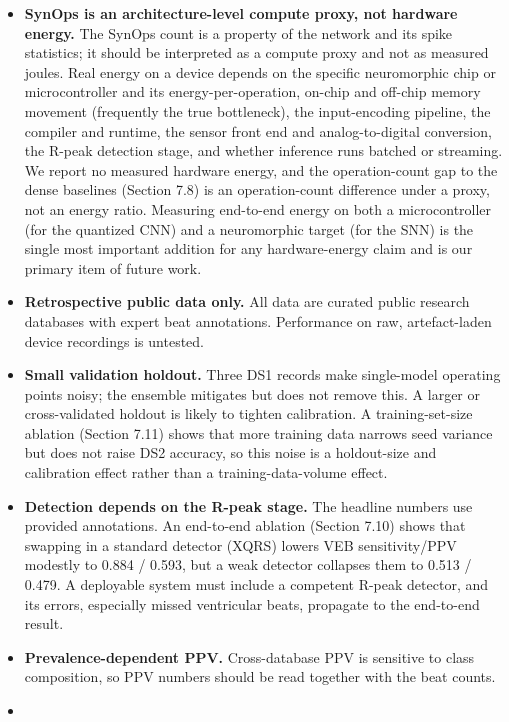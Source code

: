 \documentclass[
]{article}
\providecommand{\tightlist}{%
  \setlength{\itemsep}{0pt}\setlength{\parskip}{0pt}}
\begin{document}
\begin{itemize}
\tightlist
\item
  \textbf{SynOps is an architecture-level compute proxy, not hardware
  energy.} The SynOps count is a property of the network and its spike
  statistics; it should be interpreted as a compute proxy and not as
  measured joules. Real energy on a device depends on the specific
  neuromorphic chip or microcontroller and its energy-per-operation,
  on-chip and off-chip memory movement (frequently the true bottleneck),
  the input-encoding pipeline, the compiler and runtime, the sensor
  front end and analog-to-digital conversion, the R-peak detection
  stage, and whether inference runs batched or streaming. We report no
  measured hardware energy, and the operation-count gap to the dense
  baselines (Section 7.8) is an operation-count difference under a
  proxy, not an energy ratio. Measuring end-to-end energy on both a
  microcontroller (for the quantized CNN) and a neuromorphic target (for
  the SNN) is the single most important addition for any hardware-energy
  claim and is our primary item of future work.
\item
  \textbf{Retrospective public data only.} All data are curated public
  research databases with expert beat annotations. Performance on raw,
  artefact-laden device recordings is untested.
\item
  \textbf{Small validation holdout.} Three DS1 records make single-model
  operating points noisy; the ensemble mitigates but does not remove
  this. A larger or cross-validated holdout is likely to tighten
  calibration. A training-set-size ablation (Section 7.11) shows that
  more training data narrows seed variance but does not raise DS2
  accuracy, so this noise is a holdout-size and calibration effect
  rather than a training-data-volume effect.
\item
  \textbf{Detection depends on the R-peak stage.} The headline numbers
  use provided annotations. An end-to-end ablation (Section 7.10) shows
  that swapping in a standard detector (XQRS) lowers VEB sensitivity/PPV
  modestly to 0.884 / 0.593, but a weak detector collapses them to 0.513
  / 0.479. A deployable system must include a competent R-peak detector,
  and its errors, especially missed ventricular beats, propagate to the
  end-to-end result.
\item
  \textbf{Prevalence-dependent PPV.} Cross-database PPV is sensitive to
  class composition, so PPV numbers should be read together with the
  beat counts.
\item

\end{itemize}
\end{document}
